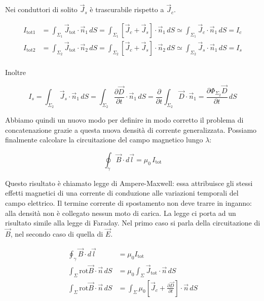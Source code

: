 Nei conduttori di solito $ \vec{J}_s  $ è trascurabile rispetto a $ \vec{J}_c $.

\begin{equation*}
	\begin{aligned}
		I_{\text{tot}1} &= \int_{\Sigma_1} \vec{J}_{\text{tot}} \cdot \vec{n}_1 \,dS = \int_{\Sigma_1} [\vec{J}_c+\vec{J}_s ] \cdot \vec{n}_1 \,dS \simeq \int_{\Sigma_1} \vec{J}_c \cdot \vec{n}_1 \,dS = I_c \\
		I_{\text{tot}2} &= \int_{\Sigma_2} \vec{J}_{\text{tot}} \cdot \vec{n}_2 \,dS = \int_{\Sigma_2} [\vec{J}_c+\vec{J}_s ] \cdot \vec{n}_2 \,dS \simeq \int_{\Sigma_2} \vec{J}_s \cdot \vec{n}_1 \,dS = I_s \\
	\end{aligned}
\end{equation*}

Inoltre

\[
	I_s = \int_{\Sigma_2} \vec{J}_s \cdot \vec{n}_1 \,dS = \int_{\Sigma_2} \frac{\partial \vec{D}}{\partial t} \cdot \vec{n}_1 \,dS = \frac{\partial}{\partial t} \int_{\Sigma_2} \vec{D} \cdot \vec{n}_1 = \frac{\partial \Phi_{\Sigma_2} \vec{D}}{\partial t} \,dS
\]

Abbiamo quindi un nuovo modo per definire in modo corretto il problema di concatenazione grazie a questa nuova densità di corrente generalizzata. Possiamo finalmente calcolare la circuitazione del campo magnetico lungo $ \lambda $:

\[
	\boxed{\oint_{\gamma} \vec{B} \cdot d\vec{l} = \mu_0 \,I_{\text{tot}}}
\]

Questo risultato è chiamato legge di Ampere-Maxwell: essa attribuisce gli stessi effetti magnetici di una corrente di conduzione alle variazioni temporali del campo elettrico. Il termine corrente di spostamento non deve trarre in inganno: alla densità non è collegato nessun moto di carica. La legge ci porta ad un risultato simile alla legge di Faraday. Nel primo caso si parla della circuitazione di $\vec{B}$, nel secondo caso di quella di $\vec{E}$.

\begin{equation*}
	\begin{aligned}
		\oint_{\gamma} \vec{B} \cdot d\vec{l} &= \mu_0 I_{\text{tot}} \\
		\int_{\Sigma} \text{rot}\vec{B} \cdot \vec{n} \, dS &= \mu_0 \int_{\Sigma}\vec{J}_{\text{tot}}\cdot \vec{n} \, dS \\
		\int_{\Sigma} \text{rot}\vec{B} \cdot \vec{n} \, dS &= \int_{\Sigma}\mu_0 \left[ \vec{J}_c + \frac{\partial \vec{D}}{\partial t} \right] \cdot \vec{n} \, dS
	\end{aligned}
\end{equation*}

